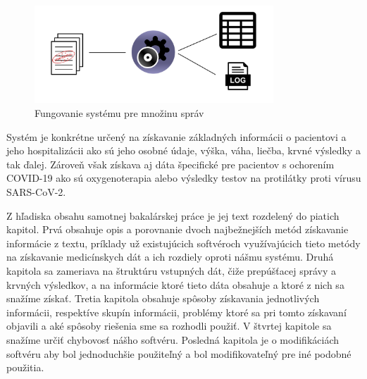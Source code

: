 \begin{figure}
	\centerline{\includegraphics[width=0.8\textwidth]{images/system_viac_sprav}}
	\caption[Fungovanie systému pre množinu správ]{Fungovanie systému pre množinu správ}
	\label{obr:systemJedna}
\end{figure}

Systém je konkrétne určený na získavanie základných informácii o pacientovi a jeho hospitalizácii ako sú jeho osobné údaje, výška, váha, liečba, krvné výsledky a tak ďalej. Zároveň však získava aj dáta špecifické pre pacientov s ochorením COVID-19 ako sú oxygenoterapia alebo výsledky testov na protilátky proti vírusu SARS-CoV-2.

Z hľadiska obsahu samotnej bakalárskej práce je jej text rozdelený do piatich kapitol. Prvá obsahuje opis a porovnanie dvoch najbežnejších metód získavanie informácie z textu, príklady už existujúcich softvéroch využívajúcich tieto metódy na získavanie medicínskych dát a ich rozdiely oproti nášmu systému. Druhá kapitola sa zameriava na štruktúru vstupných dát, čiže prepúšťacej správy a krvných výsledkov, a na informácie ktoré tieto dáta obsahuje a ktoré z nich sa snažíme získať. Tretia kapitola obsahuje spôsoby získavania jednotlivých informácii, respektíve skupín informácii, problémy ktoré sa pri tomto získavaní objavili a aké spôsoby riešenia sme sa rozhodli použiť. V štvrtej kapitole sa snažíme určiť chybovosť nášho softvéru.  Posledná kapitola je o modifikáciách softvéru aby bol jednoduchšie použiteľný a bol modifikovateľný pre iné podobné použitia.



